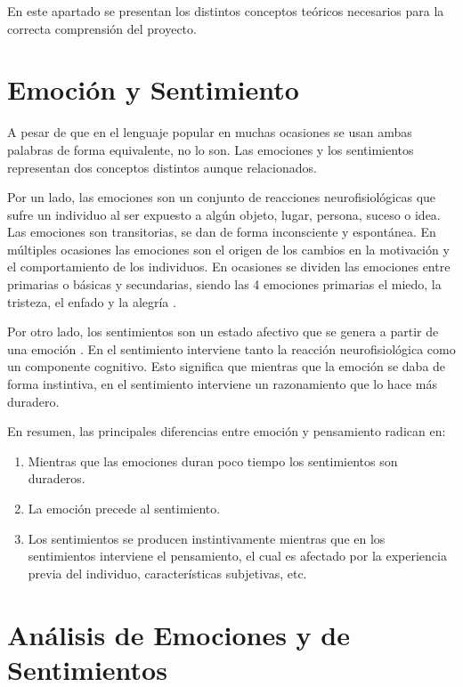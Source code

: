 
En este apartado se presentan los distintos conceptos teóricos necesarios para la correcta comprensión del proyecto.

\section{Emoción y Sentimiento}

A pesar de que en el lenguaje popular en muchas ocasiones se usan ambas palabras de forma equivalente, no lo son. Las emociones y los sentimientos representan dos conceptos distintos aunque relacionados.

Por un lado, las emociones son un conjunto de reacciones neurofisiológicas que sufre un individuo al ser expuesto a algún objeto, lugar, persona, suceso o idea. Las emociones son transitorias, se dan de forma inconsciente y espontánea. En múltiples ocasiones las emociones son el origen de los cambios en la motivación y el comportamiento de los individuos. En ocasiones se dividen las emociones entre primarias o básicas y secundarias, siendo las 4 emociones primarias el miedo, la tristeza, el enfado y la alegría \cite{psicoemocionat}.

Por otro lado, los sentimientos son un estado afectivo que se genera a partir de una emoción \cite{psicoonline}. En el sentimiento interviene tanto la reacción neurofisiológica como un componente cognitivo. Esto significa que mientras que la emoción se daba de forma instintiva, en el sentimiento interviene un razonamiento que lo hace más duradero.

En resumen, las principales diferencias entre emoción y pensamiento radican en:
\begin{enumerate}
    \item Mientras que las emociones duran poco tiempo los sentimientos son duraderos.
    \item La emoción precede al sentimiento.
    \item Los sentimientos se producen instintivamente mientras que en los sentimientos interviene el pensamiento, el cual es afectado por la experiencia previa del individuo, características subjetivas, etc.
\end{enumerate}

\section{Análisis de Emociones y de Sentimientos}

